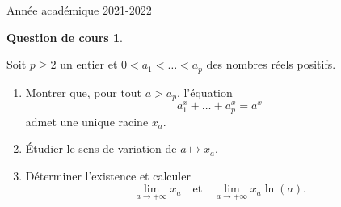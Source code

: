 \documentclass[a4paper, 11pt,openany]{book}%
\newtheorem[L]{thm}{Théorème}[section]
\newtheorem[M]{propo}[thm]{Proposition}
\newtheorem[M]{prop}[thm]{Propriété}
\newtheorem[M]{coro}[thm]{Corollaire}
\newtheorem[M]{lem}[thm]{Lemme}
\newtheorem[M,bodystyle=]{defi}[thm]{Définition}
\newtheorem[M,bodystyle=]{remark}[thm]{Remarque}
\newtheorem[M,bodystyle=]{met}[thm]{Méthode}
\newtheorem[M,bodystyle=]{ret}[thm]{A retenir}
\newtheorem[M,bodystyle=]{idee}[thm]{Idée}
\newtheorem[style=S,underline=false,bodystyle=]{exem}[thm]{Exemple}
\newtheorem[S,underline=false,bodystyle=]{exo}[thm]{Exercice}
\newtheorem[S,underline=false,bodystyle=]{appli}[thm]{Application}
\newtheorem[S,underline=false,bodystyle=]{sol}[thm]{Solution}
\newtheorem[S,underline=false,bodystyle=]{hypo}[thm]{Hypothesis}
\newtheorem[S,underline=false,bodystyle=]{nota}[thm]{Notation}
\newtheorem{cours}{Question de cours}
\begin{document}
\begin{titlepage}
\begin{sffamily}
\begin{center}

    \vfill

    {\large Année académique 2021-2022}

  \end{center}
  \end{sffamily}
\end{titlepage}
\begin{cours}
\end{cours}

\begin{exo}

Soit $p \geqslant 2$ un entier et $0<a_1< \dots <a_p$ des nombres réels positifs.
\begin{enumerate}
\item Montrer que, pour tout $a>a_p$, l'équation 
\[ a_1^x+ \dots +a_p^x =a^x\]
 admet une unique racine $x_a$.
 \item Étudier le sens de variation de $a \mapsto x_a$.
 \item Déterminer l'existence et calculer 
 \[ \lim_{a\to + \infty} x_a \quad \text{et} \quad \lim_{ a \to + \infty} x_a \ln(a). \]
\end{enumerate}

\end{exo}
\end{document}
